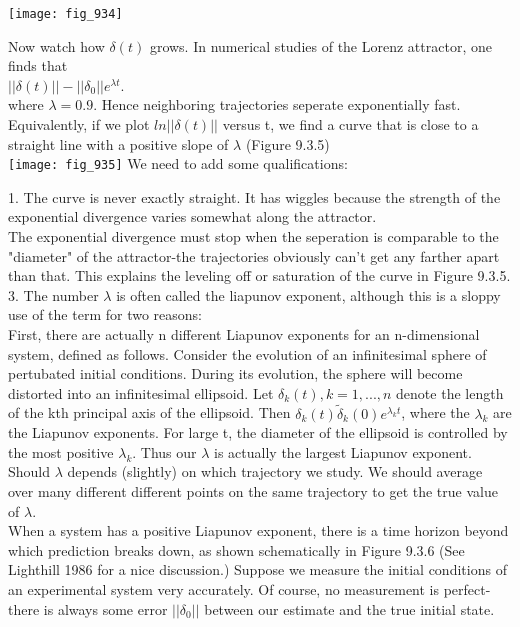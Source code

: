 \documentclass{article}
\newcommand\tab[1][1cm]{\hspace*{#1}}
\begin{document}
\texttt{[image: fig\_934]}

Now watch how $\delta (t)$ grows. In numerical studies of the Lorenz attractor, one finds that \\ \tab \tab
$||\delta(t)|| - ||\delta_{0}||e^{\lambda t}$. \\
where $\lambda = 0.9$. Hence neighboring trajectories seperate exponentially fast. Equivalently, if we plot $ln ||\delta (t)||$ versus t, we find a curve that is close to a straight line with a positive slope of $\lambda$ (Figure 9.3.5) \\

\texttt{[image: fig\_935]} 
We need to add some qualifications: \\ \tab \tab

1. The curve is never exactly straight. It has wiggles because the strength of the exponential divergence varies somewhat along the attractor. \\ \tab \tab
The exponential divergence must stop when the seperation is comparable to the "diameter" of the attractor-the trajectories obviously can't get any farther apart than that. This explains the leveling off or saturation of the curve in Figure 9.3.5. \\ \tab \tab
3. The number $\lambda$ is often called the liapunov exponent, although this is a sloppy use of the term for two reasons: \\ \tab
First, there are actually n different Liapunov exponents for an n-dimensional system, defined as follows. Consider the evolution of an infinitesimal sphere of pertubated initial conditions. During its evolution, the sphere will become distorted into an infinitesimal ellipsoid. Let $\delta_{k}(t), k=1,...,n$ denote the length of the kth principal axis of the ellipsoid. Then $\delta_{k}(t) \tilde \delta_{k}(0)e^{\lambda_{k}t}$, where the $\lambda_{k}$ are the Liapunov exponents. For large t, the diameter of the ellipsoid is controlled by the most positive $\lambda_{k}$. Thus our $\lambda$ is actually the largest Liapunov exponent. \\ \tab
Should $\lambda$ depends (slightly) on which trajectory we study. We should average over many different different points on the same trajectory to get the true value of $\lambda$. \\ \tab
When a system has a positive Liapunov exponent, there is a time horizon beyond which prediction breaks down, as shown schematically in Figure 9.3.6 (See Lighthill 1986 for a nice discussion.) Suppose we measure the initial conditions of an experimental system very accurately. Of course, no measurement is perfect-there is always some error $||\delta_{0}||$ between our estimate and the true initial state. \\
\end{document}
